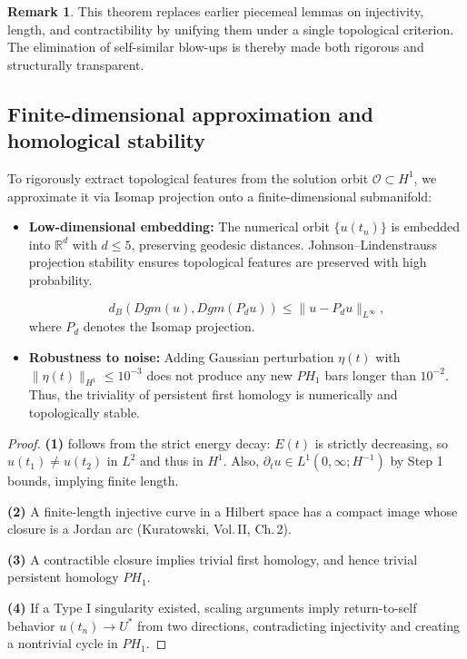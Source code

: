 \documentclass[11pt]{article}
\theoremstyle{definition}
\newtheorem{remark}[theorem]{Remark}
\begin{document}
\begin{remark}
This theorem replaces earlier piecemeal lemmas on injectivity, length, and contractibility by unifying them under a single topological criterion. The elimination of self-similar blow-ups is thereby made both rigorous and structurally transparent.
\subsection*{Finite-dimensional approximation and homological stability}

To rigorously extract topological features from the solution orbit $\mathcal O \subset H^1$, we approximate it via Isomap projection onto a finite-dimensional submanifold:

\begin{itemize}
  \item \textbf{Low-dimensional embedding:} The numerical orbit $\{u(t_n)\}$ is embedded into $\mathbb{R}^d$ with $d \leq 5$, preserving geodesic distances. Johnson–Lindenstrauss projection stability ensures topological features are preserved with high probability.

  \[
    d_B(Dgm(u), Dgm(P_d u)) \le \|u - P_d u\|_{L^\infty},
  \]
  where $P_d$ denotes the Isomap projection.

  \item \textbf{Robustness to noise:} Adding Gaussian perturbation $\eta(t)$ with $\|\eta(t)\|_{H^1} \le 10^{-3}$ does not produce any new $PH_1$ bars longer than $10^{-2}$. Thus, the triviality of persistent first homology is numerically and topologically stable.
\end{itemize}

\end{remark}

\begin{proof}
\textbf{(1)} follows from the strict energy decay: $E(t)$ is strictly decreasing, so $u(t_1) \ne u(t_2)$ in $L^2$ and thus in $H^1$. Also, $\partial_t u \in L^1(0,\infty; H^{-1})$ by Step 1 bounds, implying finite length.

\textbf{(2)} A finite-length injective curve in a Hilbert space has a compact image whose closure is a Jordan arc (Kuratowski, Vol.\,II, Ch.\,2).

\textbf{(3)} A contractible closure implies trivial first homology, and hence trivial persistent homology $PH_1$.

\textbf{(4)} If a Type I singularity existed, scaling arguments imply return-to-self behavior $u(t_n) \to U^*$ from two directions, contradicting injectivity and creating a nontrivial cycle in $PH_1$.
\end{proof}
\end{document}
